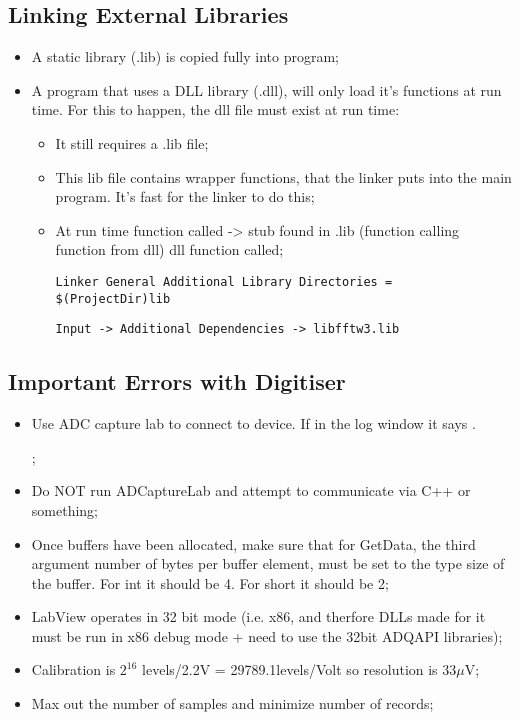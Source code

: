 \subsection{Linking External Libraries}
\begin{itemize}
\item A static library (.lib) is copied fully into program;
\item A  program that uses  a DLL library  (.dll), will only  load it's
  functions at run  time.  For this to happen, the  dll file must exist
  at run time:
  \begin{itemize}
  \item It still requires a .lib file;
  \item This lib file contains  wrapper functions, that the linker puts
    into the main program.  It's fast for the linker to do this;
  \item At  run time function  called ->  stub found in  .lib (function
    calling function from dll) \ira dll function called;
    \begin{framed}\noindent
      \texttt{Linker \ira General \ira Additional Library Directories =
        \$(ProjectDir)lib} \vspace{1em}

      \texttt{Input -> Additional Dependencies -> libfftw3.lib}
    \end{framed}
  \end{itemize}
\end{itemize}

\subsection{Important Errors with Digitiser}
\begin{itemize}
\item Use ADC capture lab to connect to device. If in the log window it
  says .

  ;
\item Do  NOT run ADCaptureLab  and attempt  to communicate via  C++ or
  something;
\item Once buffers have been allocated, make sure that for GetData, the
  third argument number of bytes per buffer element, must be set to the
  type size of the buffer. For int  it should be 4. For short it should
  be 2;
\item LabView operates in 32 bit mode (i.e. x86, and therfore DLLs made
  for it must be  run in x86 debug mode + need to  use the 32bit ADQAPI
  libraries);
\item Calibration  is $  2^{16} $  levels/2.2V =  29789.1levels/Volt so
  resolution is 33$ \mu $V;
\item Max out the number of samples and minimize number of records;
\end{itemize}

